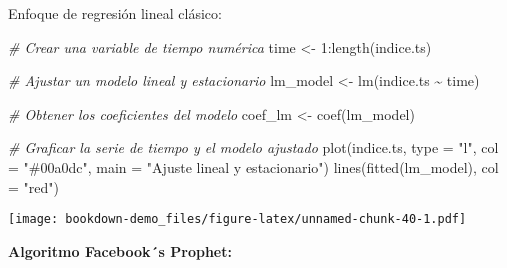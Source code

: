 \documentclass[
]{book}
\newenvironment{Shaded}{\begin{snugshade}}{\end{snugshade}}
\newcommand{\AttributeTok}[1]{\textcolor[rgb]{0.77,0.63,0.00}{#1}}
\newcommand{\CommentTok}[1]{\textcolor[rgb]{0.56,0.35,0.01}{\textit{#1}}}
\newcommand{\DecValTok}[1]{\textcolor[rgb]{0.00,0.00,0.81}{#1}}
\newcommand{\FunctionTok}[1]{\textcolor[rgb]{0.00,0.00,0.00}{#1}}
\newcommand{\NormalTok}[1]{#1}
\newcommand{\OtherTok}[1]{\textcolor[rgb]{0.56,0.35,0.01}{#1}}
\newcommand{\SpecialCharTok}[1]{\textcolor[rgb]{0.00,0.00,0.00}{#1}}
\newcommand{\StringTok}[1]{\textcolor[rgb]{0.31,0.60,0.02}{#1}}
\begin{document}
Enfoque de regresión lineal clásico:

\begin{Shaded}
\begin{Highlighting}[]
\CommentTok{\# Crear una variable de tiempo numérica}
\NormalTok{time }\OtherTok{\textless{}{-}} \DecValTok{1}\SpecialCharTok{:}\FunctionTok{length}\NormalTok{(indice.ts)}

\CommentTok{\# Ajustar un modelo lineal y estacionario}
\NormalTok{lm\_model }\OtherTok{\textless{}{-}} \FunctionTok{lm}\NormalTok{(indice.ts }\SpecialCharTok{\textasciitilde{}}\NormalTok{ time)}

\CommentTok{\# Obtener los coeficientes del modelo}
\NormalTok{coef\_lm }\OtherTok{\textless{}{-}} \FunctionTok{coef}\NormalTok{(lm\_model)}

\CommentTok{\# Graficar la serie de tiempo y el modelo ajustado}
\FunctionTok{plot}\NormalTok{(indice.ts, }\AttributeTok{type =} \StringTok{"l"}\NormalTok{, }\AttributeTok{col =} \StringTok{"\#00a0dc"}\NormalTok{, }\AttributeTok{main =} \StringTok{"Ajuste lineal y estacionario"}\NormalTok{)}
\FunctionTok{lines}\NormalTok{(}\FunctionTok{fitted}\NormalTok{(lm\_model), }\AttributeTok{col =} \StringTok{"red"}\NormalTok{)}
\end{Highlighting}
\end{Shaded}

\texttt{[image: bookdown-demo\_files/figure-latex/unnamed-chunk-40-1.pdf]}

\textbf{Algoritmo Facebook´s Prophet:}

\begin{Shaded}
\end{Shaded}
\end{document}
